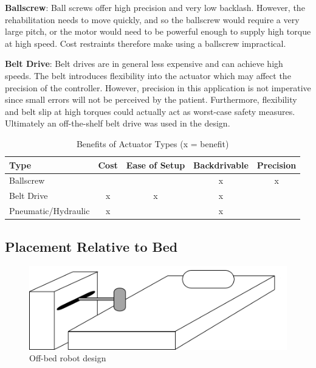 \documentclass[12pt]{report}
\begin{document}
	\textbf{Ballscrew}: Ball screws offer high precision and very low backlash. However, the rehabilitation needs to move quickly, and so the ballscrew would require a very large pitch, or the motor would need to be powerful enough to supply high torque at high speed. Cost restraints therefore make using a ballscrew impractical. 
	
	\textbf{Belt Drive}: Belt drives are in general less expensive and can achieve high speeds. The belt introduces flexibility into the actuator which may affect the precision of the controller. However, precision in this application is not imperative since small errors will not be perceived by the patient. Furthermore, flexibility and belt slip at high torques could actually act as worst-case safety measures. Ultimately an off-the-shelf belt drive was used in the design.


	
	\begin{table}[]
	\centering
	\caption{Benefits of Actuator Types (x = benefit)}	
	\begin{tabular}{|l|c|c|c|c|}
		\hline
		\textbf{Type} & \textbf{Cost} & \textbf{Ease of Setup} & 		\textbf{Backdrivable} & \textbf{Precision} \\ \hline
		Ballscrew &  &  & x & x \\ \hline
		Belt Drive & x & x & x & \\ \hline
		Pneumatic/Hydraulic & x &  & x & \\ \hline
		\end{tabular}
	\label{tab:actuator}
	\end{table}
				
		
		\subsection{Placement Relative to Bed}
		
			
	\begin{figure}[t] 
		\centering
		\includegraphics[width=0.75\linewidth]{off-bed}
		\caption{Off-bed robot design}
		\label{fig:off-bed}
	\end{figure}	
	
\end{document}
